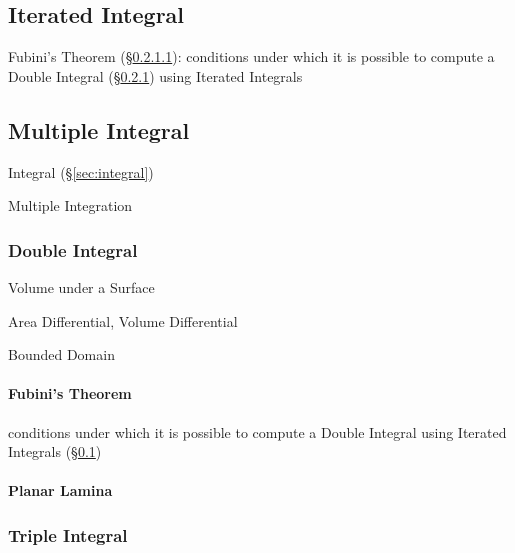 {\subsection{Iterated Integral}\label{sec:iterated_integral}

\fist Fubini's Theorem (\S\ref{sec:fubinis_theorem}): conditions under which it
is possible to compute a Double Integral (\S\ref{sec:double_integral}) using
Iterated Integrals



\subsection{Multiple Integral}\label{sec:multiple_integral}

Integral (\S\ref{sec:integral})

Multiple Integration



\subsubsection{Double Integral}\label{sec:double_integral}

Volume under a Surface

Area Differential, Volume Differential

Bounded Domain



\paragraph{Fubini's Theorem}\label{sec:fubinis_theorem}\hfill

conditions under which it is possible to compute a Double Integral using
Iterated Integrals (\S\ref{sec:iterated_integral})



\paragraph{Planar Lamina}\label{sec:planar_lamina}\hfill



\subsubsection{Triple Integral}\label{sec:triple_integral}

}
